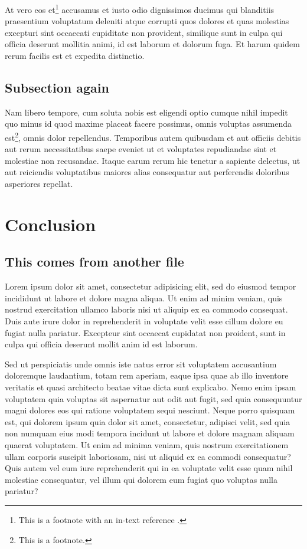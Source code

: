 \documentclass[11pt,article,oneside]{memoir}
\begin{document}
At vero eos et\footnote{This is a footnote with an in-text reference
  \textcite{HeissKelley:2017}.} accusamus et iusto odio dignissimos
ducimus qui blanditiis praesentium voluptatum deleniti atque corrupti
quos dolores et quas molestias excepturi sint occaecati cupiditate non
provident, similique sunt in culpa qui officia deserunt mollitia animi,
id est laborum et dolorum fuga. Et harum quidem rerum facilis est et
expedita distinctio.

\hypertarget{subsection-again}{%
\subsection{Subsection again}\label{subsection-again}}

Nam libero tempore, cum soluta nobis est eligendi optio cumque nihil
impedit quo minus id quod maxime placeat facere possimus, omnis voluptas
assumenda est\footnote{This is a footnote.}, omnis dolor repellendus.
Temporibus autem quibusdam et aut officiis debitis aut rerum
necessitatibus saepe eveniet ut et voluptates repudiandae sint et
molestiae non recusandae. Itaque earum rerum hic tenetur a sapiente
delectus, ut aut reiciendis voluptatibus maiores alias consequatur aut
perferendis doloribus asperiores repellat.

\hypertarget{conclusion}{%
\section{Conclusion}\label{conclusion}}

\hypertarget{this-comes-from-another-file}{%
\subsection{This comes from another
file}\label{this-comes-from-another-file}}

Lorem ipsum dolor sit amet, consectetur adipisicing elit, sed do eiusmod
tempor incididunt ut labore et dolore magna aliqua. Ut enim ad minim
veniam, quis nostrud exercitation ullamco laboris nisi ut aliquip ex ea
commodo consequat. Duis aute irure dolor in reprehenderit in voluptate
velit esse cillum dolore eu fugiat nulla pariatur. Excepteur sint
occaecat cupidatat non proident, sunt in culpa qui officia deserunt
mollit anim id est laborum.

Sed ut perspiciatis unde omnis iste natus error sit voluptatem
accusantium doloremque laudantium, totam rem aperiam, eaque ipsa quae ab
illo inventore veritatis et quasi architecto beatae vitae dicta sunt
explicabo. Nemo enim ipsam voluptatem quia voluptas sit aspernatur aut
odit aut fugit, sed quia consequuntur magni dolores eos qui ratione
voluptatem sequi nesciunt. Neque porro quisquam est, qui dolorem ipsum
quia dolor sit amet, consectetur, adipisci velit, sed quia non numquam
eius modi tempora incidunt ut labore et dolore magnam aliquam quaerat
voluptatem. Ut enim ad minima veniam, quis nostrum exercitationem ullam
corporis suscipit laboriosam, nisi ut aliquid ex ea commodi consequatur?
Quis autem vel eum iure reprehenderit qui in ea voluptate velit esse
quam nihil molestiae consequatur, vel illum qui dolorem eum fugiat quo
voluptas nulla pariatur?

\printbibliography[heading=subbibliography, title=References]
\end{document}

